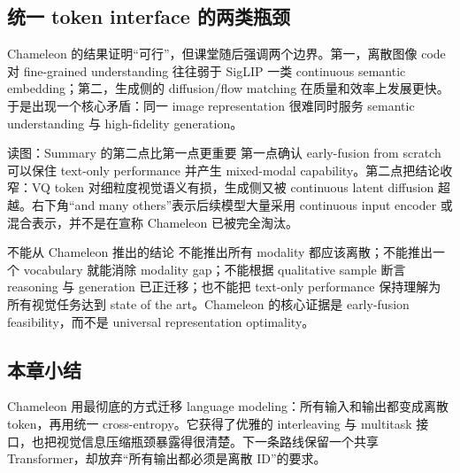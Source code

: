 \subsection{统一 token interface 的两类瓶颈}

Chameleon 的结果证明“可行”，但课堂随后强调两个边界。第一，离散图像 code 对 fine-grained understanding 往往弱于 SigLIP 一类 continuous semantic embedding；第二，生成侧的 diffusion/flow matching 在质量和效率上发展更快。于是出现一个核心矛盾：同一 image representation 很难同时服务 semantic understanding 与 high-fidelity generation。


\begin{knowledgebox}{读图：Summary 的第二点比第一点更重要}
第一点确认 early-fusion from scratch 可以保住 text-only performance 并产生 mixed-modal capability。第二点把结论收窄：VQ token 对细粒度视觉语义有损，生成侧又被 continuous latent diffusion 超越。右下角“and many others”表示后续模型大量采用 continuous input encoder 或混合表示，并不是在宣称 Chameleon 已被完全淘汰。
\end{knowledgebox}

\begin{warningbox}{不能从 Chameleon 推出的结论}
不能推出所有 modality 都应该离散；不能推出一个 vocabulary 就能消除 modality gap；不能根据 qualitative sample 断言 reasoning 与 generation 已正迁移；也不能把 text-only performance 保持理解为所有视觉任务达到 state of the art。Chameleon 的核心证据是 early-fusion feasibility，而不是 universal representation optimality。
\end{warningbox}

\subsection{本章小结}

Chameleon 用最彻底的方式迁移 language modeling：所有输入和输出都变成离散 token，再用统一 cross-entropy。它获得了优雅的 interleaving 与 multitask 接口，也把视觉信息压缩瓶颈暴露得很清楚。下一条路线保留一个共享 Transformer，却放弃“所有输出都必须是离散 ID”的要求。

